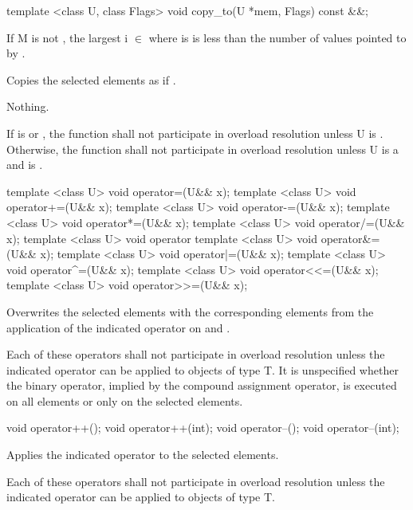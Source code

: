 \begin{itemdecl}
template <class U, class Flags> void copy_to(U *mem, Flags) const &&;
\end{itemdecl}
\begin{itemdescr}
   If \type M is not \bool, the largest i $\in$ \code{[0, M::size())} where  is \true is less than the number of values pointed to by .

  \pnum\effects Copies the selected elements as if  .

  \pnum\throws Nothing.

  \pnum\remarks If  is \bool or , the function shall not participate in overload resolution unless \type U is \bool.
  Otherwise, the function shall not participate in overload resolution unless \type U is a \realArithmeticType and  is \true.
\end{itemdescr}

\begin{itemdecl}
template <class U> void operator=(U&& x);
template <class U> void operator+=(U&& x);
template <class U> void operator-=(U&& x);
template <class U> void operator*=(U&& x);
template <class U> void operator/=(U&& x);
template <class U> void operator%
template <class U> void operator&=(U&& x);
template <class U> void operator|=(U&& x);
template <class U> void operator^=(U&& x);
template <class U> void operator<<=(U&& x);
template <class U> void operator>>=(U&& x);
\end{itemdecl}
\begin{itemdescr}
  \pnum\effects
  Overwrites the selected elements with the corresponding elements from the application of the indicated operator on  and .

  \pnum\remarks Each of these operators shall not participate in overload resolution unless the indicated operator can be applied to objects of type \type T.
  It is unspecified whether the binary operator, implied by the compound assignment operator, is executed on all elements or only on the selected elements.
\end{itemdescr}

\begin{itemdecl}
void operator++();
void operator++(int);
void operator--();
void operator--(int);
\end{itemdecl}
\begin{itemdescr}
  \pnum\effects Applies the indicated operator to the selected elements.

  \pnum\remarks Each of these operators shall not participate in overload resolution unless the indicated operator can be applied to objects of type \type T.
\end{itemdescr}

